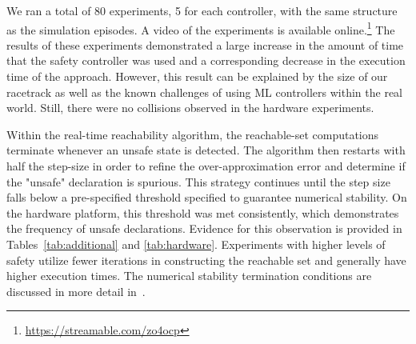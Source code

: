 \documentclass[manuscript,screen,review]{acmart}
\begin{document}



We ran a total of 80 experiments, 5 for each controller, with the same structure as the simulation episodes. A video of the experiments is available online.\footnote{\url{https://streamable.com/zo4ocp}} The results of these experiments demonstrated a large increase in the amount of time that the safety controller was used and a corresponding decrease in the execution time of the approach. However, this result can be explained by the size of our racetrack as well as the known challenges of using ML controllers within the real world. Still, there were no collisions observed in the hardware experiments.

Within the real-time reachability algorithm, the reachable-set computations terminate whenever an unsafe state is detected. The algorithm then restarts with half the step-size in order to refine the over-approximation error and determine if the "unsafe" declaration is spurious. This strategy continues until the step size falls below a pre-specified threshold specified to guarantee numerical stability. On the hardware platform, this threshold was met consistently, which demonstrates the frequency of unsafe declarations. Evidence for this observation is provided in Tables~\ref{tab:additional} and \ref{tab:hardware}. Experiments with higher levels of safety utilize fewer iterations in constructing the reachable set and generally have higher execution times. 
The numerical stability termination conditions are discussed in more detail in~\cite{Johnson2016}.
\end{document}
